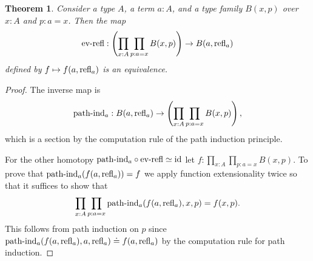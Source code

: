 \documentclass{amsart}
\theoremstyle{theorem}
\newtheorem*{thm}{Theorem}
\theoremstyle{definition}
\theoremstyle{remark}
\newcommand{\0}{\mathbbe{0}}
\newcommand{\1}{\mathbbe{1}}
\newcommand{\2}{\mathbbe{2}}
\newcommand{\3}{\mathbbe{3}}
\newcommand{\4}{\mathbbe{4}}
\newcommand{\term}[1]{{\textup{#1}}}
\newcommand{\id}{\term{id}}
\newcommand{\refl}{\term{refl}}
\newcommand{\pathind}{\term{path}\text{-}\term{ind}}
\begin{document}
\begin{thm} Consider a type $A$, a term $a :A$, and a type family $B(x,p)$ over $x:A$ and $p: a=x$. Then the map
\[ \term{ev-refl} : \left( \prod_{x:A}\prod_{p:a=x} B(x,p) \right) \to B(a,\refl_a)\]
defined by $f \mapsto f(a,\refl_a)$ is an equivalence.
\end{thm}
\begin{proof}
The inverse map is
\[ \pathind_a : B(a,\refl_a) \to \left( \prod_{x:A}\prod_{p:a=x} B(x,p) \right),\]
which is a section by the computation rule of the path induction principle.

For the other homotopy $\pathind_a \circ \term{ev-refl} \simeq \id$ let $f : \prod_{x:A} \prod_{p:a=x}B(x,p)$. To prove that
$\pathind_a(f(a,\refl_a)) = f$ we apply function extensionality twice so that it suffices to show that
\[ \prod_{x:A} \prod_{p:a=x} \pathind_a(f(a,\refl_a),x,p) = f(x,p).\] This follows from path induction on $p$ since $\pathind_a(f(a,\refl_a),a,\refl_a) \doteq f(a,\refl_a)$ by the computation rule for path induction.
\end{proof}
\end{document}
